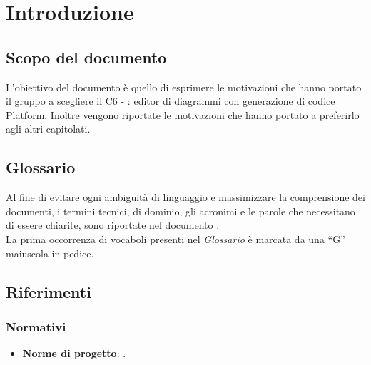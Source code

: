 \documentclass[../StudiodiFattibilita.tex]{subfiles}
\begin{document}
	\section{Introduzione}
		\subsection{Scopo del documento}
			L'obiettivo del documento è quello di esprimere le motivazioni che hanno portato il gruppo a scegliere il  C6 - \progetto: editor di diagrammi  con generazione di codice Platform.
			Inoltre vengono riportate le motivazioni che hanno portato a preferirlo agli altri capitolati.
		\subsection{Glossario}
			Al fine di evitare ogni ambiguità di linguaggio e massimizzare la
			comprensione dei documenti, i termini tecnici, di dominio, gli
			acronimi e le parole che necessitano di essere chiarite, sono
			riportate nel documento \glossariov.\\
			La prima occorrenza di vocaboli presenti nel \textit{Glossario} è
			marcata da una ``G'' maiuscola in pedice.
		\subsection{Riferimenti}
			\subsubsection{Normativi}
			\begin{itemize}
				\item \textbf{Norme di progetto}: \normediprogettov.
			\end{itemize}
\end{document}
